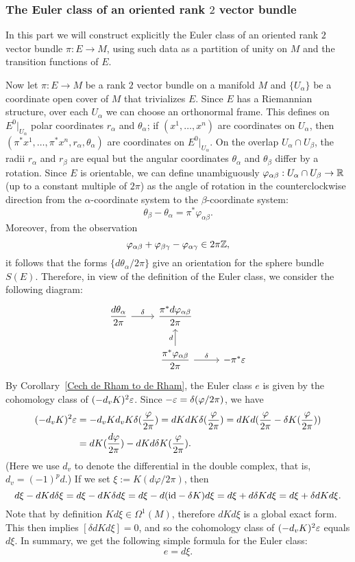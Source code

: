 \subsubsection{The Euler class of an oriented rank \boldmath$2$ vector bundle}
In this part we will construct explicitly the Euler class of an oriented rank $2$ vector bundle $\pi:E\to M$, using such data as a partition of unity on $M$ and the 
transition functions of $E$.\par
Now let $\pi:E\to M$ be a rank $2$ vector bundle on a manifold $M$ and $\{U_\alpha\}$ be a coordinate open cover of $M$ that trivializes $E$. Since $E$ has a 
Riemannian structure, over each $U_\alpha$ we can choose an orthonormal frame. This defines on $E^0|_{U_\alpha}$ polar coordinates $r_\alpha$ and $\theta_\alpha$; if 
$(x^1,\dots,x^n)$ are coordinates on $U_\alpha$, then $(\pi^*x^1,\dots,\pi^*x^n,r_\alpha,\theta_\alpha)$ are coordinates on $E^0|_{U_\alpha}$. On the overlap 
$U_\alpha\cap U_\beta$, the radii $r_\alpha$ and $r_\beta$ are equal but the angular coordinates $\theta_\alpha$ and $\theta_\beta$ differ by a rotation. Since $E$ 
is orientable, we can define unambiguously $\varphi_{\alpha\beta}:U_\alpha\cap U_{\beta}\to\mathbb{R}$ (up to a constant multiple of $2\pi$) as the angle of rotation in the 
counterclockwise direction from the $\alpha$-coordinate system to the $\beta$-coordinate system:
\[\theta_\beta-\theta_\alpha=\pi^*\varphi_{\alpha\beta}.\]
Moreover, from the observation
\[\varphi_{\alpha\beta}+\varphi_{\beta\gamma}-\varphi_{\alpha\gamma}\in2\pi\mathbb{Z},\]
it follows that the forms $\{d\theta_\alpha/2\pi\}$ give an orientation for the sphere bundle $S(E)$. Therefore, in view of the definition of the Euler class, we consider the following 
diagram:
\[\begin{tikzcd}
\dfrac{d\theta_\alpha}{2\pi}\ar[r,"\delta"]&\dfrac{\pi^*d\varphi_{\alpha\beta}}{2\pi}\\
&\dfrac{\pi^*\varphi_{\alpha\beta}}{2\pi}\ar[u,"d"]\ar[r,"\delta"]&-\pi^*\eps
\end{tikzcd}\]
By Corollary~\ref{Cech de Rham to de Rham}, the Euler class $e$ is given by the cohomology class of $(-d_vK)^2\varepsilon$. Since $-\varepsilon=\delta(\varphi/2\pi)$, we have
\begin{align*}
(-d_vK)^2\varepsilon&=-d_vKd_vK\delta(\frac{\varphi}{2\pi})=dKdK\delta(\frac{\varphi}{2\pi})=dKd(\frac{\varphi}{2\pi}-\delta K(\frac{\varphi}{2\pi}))\\
&=dK(\frac{d\varphi}{2\pi})-dKd\delta K(\frac{\varphi}{2\pi}).
\end{align*}
(Here we use $d_v$ to denote the differential in the double complex, that is, $d_v=(-1)^pd$.) If we set $\xi:=K(d\varphi/2\pi)$, then
\[d\xi-dKd\delta \xi=d\xi-dK\delta d\xi=d\xi-d(\mathrm{id}-\delta K)d\xi=d\xi+d\delta Kd\xi=d\xi+\delta dKd\xi.\]
Note that by definition $Kd\xi\in\Omega^1(M)$, therefore $dKd\xi$ is a global exact form. This then implies $[\delta dKd\xi]=0$, and so the cohomology class of $(-d_vK)^2\varepsilon$ 
equals $d\xi$. In summary, we get the following simple formula for the Euler class:
\[e=d\xi.\]

